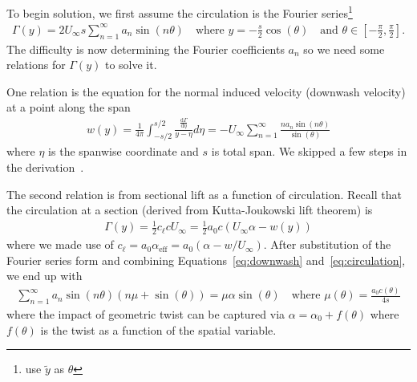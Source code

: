 \documentclass[10pt]{article}
\newcommand{\dd}[2]{\frac{\textrm{d} #1}{\textrm{d} #2}}
\newcommand{\half}{\frac{1}{2}}
\newcommand{\be}{\begin{eqnarray}}
\newcommand{\ee}{\end{eqnarray}}
\newcommand{\Uinf}{U_{\infty}}
\newcommand{\tn}[1]{\textrm{#1}}
\begin{document}
To begin solution, we first assume the circulation is the Fourier series\footnote{\citet{Kerwin2010} use $\tilde{y}$ as $\theta$}
\be
\Gamma(y) = 2 \Uinf s \sum_{n=1}^{\infty} a_n \sin \left( n \theta \right)
\quad \tn{where }
y = -\frac{s}{2}\cos(\theta)
\quad \tn{and }
\theta \in \left[-\frac{\pi}{2},\frac{\pi}{2}\right]
.
\ee
The difficulty is now determining the Fourier coefficients $a_n$ so we need some relations for $\Gamma(y)$ to solve it.

One relation is the equation for the normal induced velocity (downwash velocity) at a point along the span
\be
\label{eq:downwash}
w(y) = \frac{1}{4\pi}
\int_{-s/2}^{s/2} \frac{\dd{\Gamma}{\eta} }{y - \eta} d\eta
=
\boxed{
	-\Uinf \sum_{n=1}^{\infty} \frac{n a_n \sin \left( n \theta \right)}{\sin(\theta)}
}
\ee
where $\eta$ is the spanwise coordinate and $s$ is total span.
We skipped a few steps in the derivation~\cite[Sec.~3.7]{Kerwin2010}.

The second relation is from sectional lift as a function of circulation.
Recall that the circulation at a section (derived from Kutta-Joukowski lift theorem) is
\be
\label{eq:circulation}
\Gamma(y) = \half c_\ell c \Uinf
=\half a_0 c \left(\Uinf \alpha - w(y)\right)
\ee
where we made use of $c_\ell = a_0 \alpha_{\tn{eff}} = a_0 \left(\alpha - w/\Uinf\right)$.
After substitution of the Fourier series form and combining Equations~\eqref{eq:downwash} and~\eqref{eq:circulation}, we end up with
\be
\label{eq:circulation2}
\sum_{n=1}^{\infty} a_n \sin(n\theta) \left(n\mu + \sin(\theta)\right)
=
\mu \alpha \sin(\theta)
\quad \tn{where }\mu(\theta) = \frac{a_0 c(\theta)}{ 4 s}
\ee
where the impact of geometric twist can be captured via $\alpha = \alpha_0 + f(\theta)$ where $f(\theta)$ is the twist as a function of the spatial variable.
\end{document}
